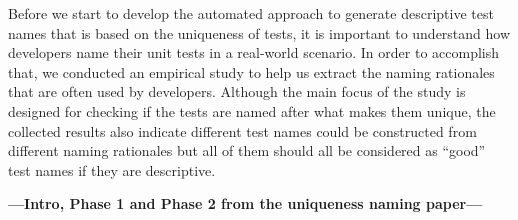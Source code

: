 Before we start to develop the automated approach to generate descriptive test names that is based on the uniqueness of tests, it is important to understand how developers name their unit tests in a real-world scenario.
%
In order to accomplish that, we conducted an empirical study to help us extract the naming rationales that are often used by developers.
%
Although the main focus of the study is designed for checking if the tests are named after what makes them unique, the collected results also indicate different test names could be constructed from different naming rationales but all of them should all be considered as \enquote{good} test names if they are descriptive.

\textbf{---Intro, Phase 1 and Phase 2 from the uniqueness naming paper---}




